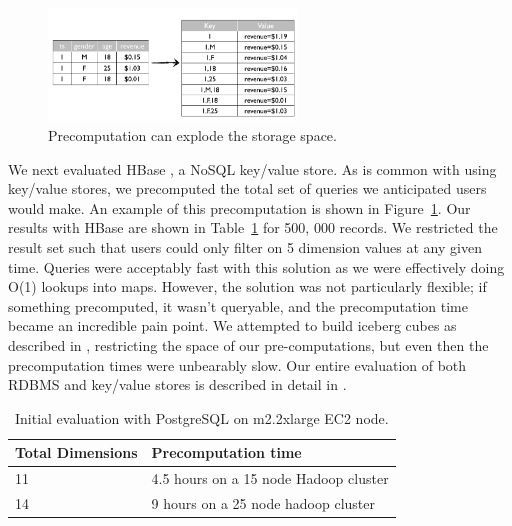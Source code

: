 \documentclass{vldb}
\begin{document}
\begin{figure}
\centering
\includegraphics[width = 2.6in]{precompute}
\caption{Precomputation can explode the storage space.
}
\label{fig:precompute}
\end{figure}

We next evaluated HBase \cite{george2011hbase}, a NoSQL key/value store. As is
common with using key/value stores, we precomputed the total set of queries we
anticipated users would make. An example of this precomputation is shown in
Figure~\ref{fig:precompute}. Our results with HBase are shown in
Table~\ref{tab:hbase_results} for 500, 000 records. We restricted the result
set such that users could only filter on 5 dimension values at any given time.
Queries were acceptably fast with this solution as we were effectively doing
O(1) lookups into maps.  However, the solution was not particularly flexible;
if something precomputed, it wasn’t queryable, and the precomputation time
became an incredible pain point. We attempted to build iceberg cubes as
described in \cite{beyer1999bottom}, restricting the space of our
pre-computations, but even then the precomputation times were unbearably slow.
Our entire evaluation of both RDBMS and key/value stores is described in detail
in \cite{tschetter2011druid}.

\begin{table}
\centering
\scriptsize\begin{tabular}{| l | l |} \hline
\textbf{Total Dimensions} & \textbf{Precomputation time} \\ \hline
  11 & 4.5 hours on a 15 node Hadoop cluster \\ \hline
  14 & 9 hours on a 25 node hadoop cluster \\ \hline
\end{tabular}
\normalsize
\caption{Initial evaluation with PostgreSQL on m2.2xlarge EC2 node.}
\label{tab:hbase_results}
\end{table}
\end{document}
